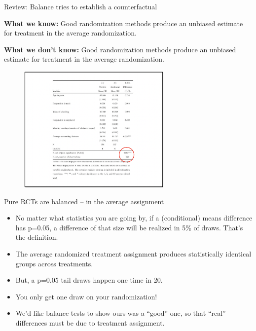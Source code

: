 \documentclass[aspectratio=169]{beamer}
\begin{document}
\begin{frame}[fragile]{Review: Balance tries to establish a counterfactual}
\begin{multicols}{2}	
	
	\textbf{What we know:}
	\newline Good randomization methods produce an unbiased estimate for treatment in the average randomization.
	
	\textbf{What we don’t know:}
	\newline Good randomization methods produce an unbiased estimate for treatment in the average randomization.
	
	\begin{figure}
		\centering
		\includegraphics[width=75mm]{img/Balance}
	\end{figure}
	
\end{multicols}
\end{frame}


\begin{frame}{Pure RCTs are balanced – in the average assignment}

\begin{itemize}[<default overlay specification>]
	\item<1> No matter what statistics you are going by, if a (conditional) means difference has p=0.05, a difference of that size will be realized in 5\% of draws. That’s the definition.
	\item<1> The average randomized treatment assignment produces statistically identical groups across treatments.
	\item<1> But, a p=0.05 tail draws happen one time in 20. 
	\item<1> You only get one draw on your randomization!
	\item<1> We’d like balance tests to show ours was a “good” one, so that “real” differences must be due to treatment assignment.
\end{itemize}

\end{frame}
\end{document}
